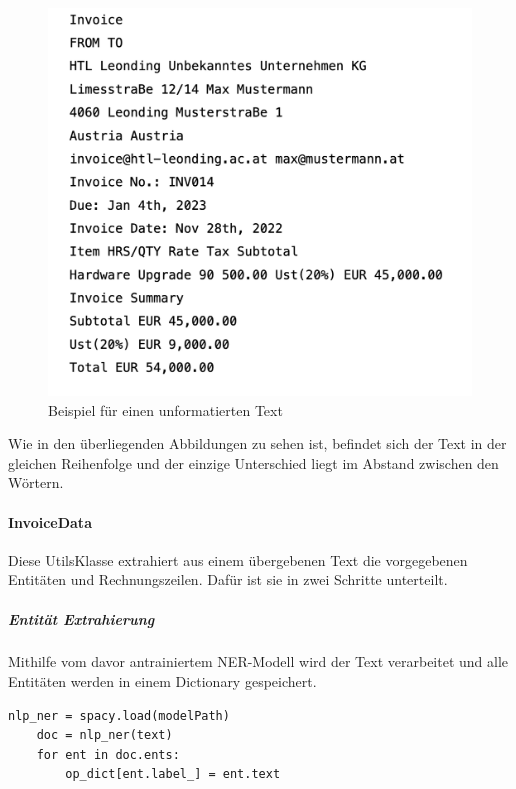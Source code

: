 \begin{figure}[H]
    \centering
    \includegraphics[scale=0.4]{sections/implementation/images/unformated.png}
    \caption{Beispiel für einen unformatierten Text}
\end{figure}

Wie in den überliegenden Abbildungen zu sehen ist, befindet sich der Text in der gleichen Reihenfolge und der einzige Unterschied liegt im Abstand zwischen den Wörtern.

\paragraph{InvoiceData}

Diese UtilsKlasse extrahiert aus einem übergebenen Text die vorgegebenen Entitäten und Rechnungszeilen. Dafür ist sie in zwei Schritte unterteilt.

\subparagraph{Entität Extrahierung} 

Mithilfe vom davor antrainiertem NER-Modell wird der Text verarbeitet und alle Entitäten werden in einem Dictionary gespeichert. 

\begin{lstlisting}[caption={Extrahierung von Entitäten}]
    nlp_ner = spacy.load(modelPath)
    doc = nlp_ner(text)
    for ent in doc.ents:      
        op_dict[ent.label_] = ent.text
\end{lstlisting}


